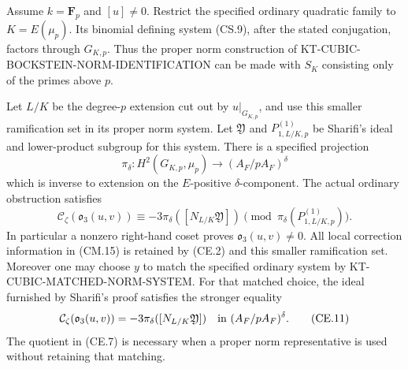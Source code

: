 \begin{theorem}
Assume \(k=\mathbf F_p\) and \([u]\ne0\).  Restrict the specified
ordinary quadratic family to \(K=E(\mu_p)\).
Its binomial defining system (CS.9), after the stated conjugation,
factors through \(G_{K,p}\).  Thus the proper norm construction
of KT-CUBIC-BOCKSTEIN-NORM-IDENTIFICATION can be made with
\(S_K\) consisting only of the primes above \(p\).

Let \(L/K\) be the degree-\(p\) extension cut out by \(u|_{G_{K,p}}\),
and use this smaller ramification set in its proper norm system.
Let \(\mathfrak Y\) and \(P^{(1)}_{1,L/K,p}\) be Sharifi's
ideal and lower-product subgroup for this system.  There is a
specified projection
\[
 \pi_\delta:H^2(G_{K,p},\mu_p)
           \longrightarrow (A_F/pA_F)^\delta
                                                        \tag{CE.6}
\]
which is inverse to extension on the \(E\)-positive
\(\delta\)-component.  The actual ordinary obstruction satisfies
\[
 \mathcal C_\zeta(\mathfrak o_3(u,v))
 \equiv -3\pi_\delta([N_{L/K}\mathfrak Y])
          \pmod{\pi_\delta(P^{(1)}_{1,L/K,p})}.
                                                        \tag{CE.7}
\]
In particular a nonzero right-hand coset proves
\(\mathfrak o_3(u,v)\ne0\).  All local correction information
in (CM.15) is retained by (CE.2) and this smaller ramification
set.  Moreover one may choose \(y\) to match the specified
ordinary system by KT-CUBIC-MATCHED-NORM-SYSTEM.  For that
matched choice, the ideal furnished by Sharifi's proof satisfies
the stronger equality
\[
 \mathcal C_\zeta(\mathfrak o_3(u,v))
            =-3\pi_\delta([N_{L/K}\mathfrak Y])
       \quad\hbox{in }(A_F/pA_F)^\delta .
                                                       \tag{CE.11}
\]
The quotient in (CE.7) is necessary when a proper norm
representative is used without retaining that matching.
\end{theorem}


